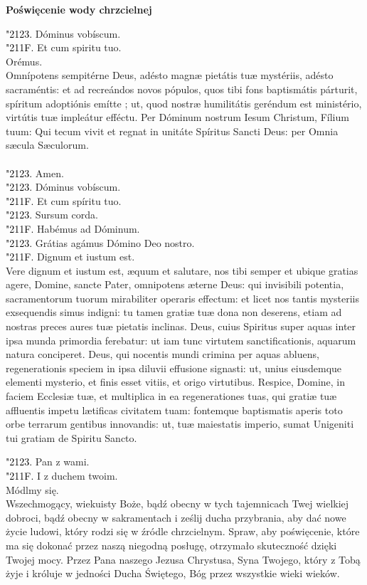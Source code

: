 \documentclass[10pt,a5paper]{book}
\newcommand{\kol}{black}
\newcommand{\textjuni}[1]{{\fontspec{Junicode-Regular}#1}}
\newcommand{\vv}{\textcolor{\kol}{\textjuni{\char"2123. }}}
\newcommand{\rr}{\textcolor{\kol}{\textjuni{\char"211F. }}}
\newcommand{\oremus}[3]{\medskip\centerline{\textbf{#1}}\medskip
	\begin{sloppypar}
		\begin{paracol}{2}
			\setlength{\columnsep}{0em}
			\begin{leftcolumn}
				#2
			\end{leftcolumn}
			\begin{rightcolumn}
				#3
			\end{rightcolumn}
		\end{paracol}
	\end{sloppypar}}
\begin{document}
				\oremus{Poświęcenie wody chrzcielnej}{
					\vv Dóminus vobíscum.\\
					\rr Et cum spiritu tuo.\\
					Orémus.\\
					Omnípotens sempitérne Deus, adésto magnæ pietátis tuæ mystériis, adésto sacraméntis: et ad recreándos novos pópulos, quos tibi fons baptismátis párturit, spíritum adoptiónis emítte ; ut, quod nostræ humilitátis geréndum est ministério, virtútis tuæ impleátur efféctu. Per Dóminum nostrum Iesum Christum, Fílium tuum: Qui tecum vivit et regnat in unitáte Spíritus Sancti Deus: per Omnia s\ae cula S\ae culorum. \\ \\
					\vv Amen.\\
					\vv Dóminus vobíscum.\\
					\rr Et cum spíritu tuo.\\
					\vv Sursum corda.\\
					\rr Habémus ad Dóminum.\\
					\vv Grátias agámus Dómino Deo nostro.\\
					\rr Dignum et iustum est.\\
					Vere dignum et iustum est, æquum et salutare, nos tibi semper et ubique gratias agere, Domine, sancte Pater, omnipotens æterne Deus: qui invisibili potentia, sacramentorum tuorum mirabiliter operaris effectum: et licet nos tantis mysteriis exsequendis simus indigni: tu tamen gratiæ tuæ dona non deserens, etiam ad nostras preces aures tuæ pietatis inclinas. Deus, cuius Spiritus super aquas inter ipsa munda primordia ferebatur: ut iam tunc virtutem sanctificationis, aquarum natura conciperet. Deus, qui nocentis mundi crimina per aquas abluens, regenerationis speciem in ipsa diluvii effusione signasti: ut, unius eiusdemque elementi mysterio, et finis esset vitiis, et origo virtutibus. 
					Respice, Domine, in faciem Ecclesiæ tuæ, et multiplica in ea regenerationes tuas, qui gratiæ tuæ affluentis impetu lætificas civitatem tuam: fontemque baptismatis aperis toto orbe terrarum gentibus innovandis: ut, tuæ maiestatis imperio, sumat Unigeniti tui gratiam de Spiritu Sancto.}{
					\vv Pan z wami.\\
					\rr I z duchem twoim.\\
					Módlmy się.\\
					Wszechmogący, wiekuisty Boże, bądź obecny w tych tajemnicach Twej wielkiej dobroci, bądź obecny w sakramentach i ześlij ducha przybrania, aby dać nowe życie ludowi, który rodzi się w źródle chrzcielnym. Spraw, aby poświęcenie, które ma się dokonać przez naszą niegodną posługę, otrzymało skuteczność dzięki Twojej mocy. Przez Pana naszego Jezusa Chrystusa, Syna Twojego, który z Tobą żyje i króluje w jedności Ducha Świętego, Bóg przez wszystkie wieki wieków.\\
}
\end{document}
